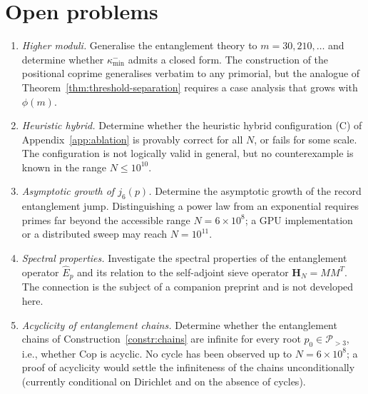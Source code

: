 \documentclass[11pt]{amsart}
\numberwithin{equation}{section}
\newcommand{\cP}{\mathcal{P}}
\newcommand{\kminm}{\kappa_{\min}^{-}}
\newcommand{\Cop}{\mathrm{Cop}}
\theoremstyle{plain}
\theoremstyle{definition}
\begin{document}
\section{Open problems}
\label{sec:open}

\begin{enumerate}
\item[(P1)] \emph{Higher moduli.} Generalise the entanglement theory
  to $m=30,210,\dots$ and determine whether $\kminm$ admits a closed
  form. The construction of the positional coprime generalises
  verbatim to any primorial, but the analogue of
  Theorem~\ref{thm:threshold-separation} requires a case analysis
  that grows with $\phi(m)$.

\item[(P2)] \emph{Heuristic hybrid.} Determine whether the heuristic
  hybrid configuration (C) of Appendix~\ref{app:ablation} is provably
  correct for all $N$, or fails for some scale. The configuration is
  not logically valid in general, but no counterexample is known in
  the range $N\le 10^{10}$.

\item[(P3)] \emph{Asymptotic growth of $j_6(p)$.} Determine the
  asymptotic growth of the record entanglement jump. Distinguishing
  a power law from an exponential requires primes far beyond the
  accessible range $N=6\times 10^8$; a GPU implementation or a
  distributed sweep may reach $N=10^{11}$.

\item[(P4)] \emph{Spectral properties.} Investigate the spectral
  properties of the entanglement operator $\hat{E}_p$ and its
  relation to the self-adjoint sieve operator $\mathbf{H}_N=MM^T$.
  The connection is the subject of a companion preprint
  \cite{PeinadorRPC2026} and is not developed here.

\item[(P5)] \emph{Acyclicity of entanglement chains.} Determine
  whether the entanglement chains of Construction~\ref{constr:chains}
  are infinite for every root $p_0\in\cP_{>3}$, i.e., whether $\Cop$
  is acyclic. No cycle has been observed up to $N=6\times 10^8$; a
  proof of acyclicity would settle the infiniteness of the chains
  unconditionally (currently conditional on Dirichlet and on the
  absence of cycles).
\end{enumerate}

\appendix
\end{document}
